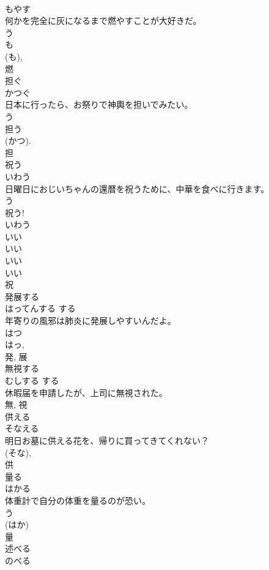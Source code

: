 \documentclass[8pt]{extreport}
\begin{document}
\begin{CJK}{UTF8}{min}
\\	もやす	
\\	何かを完全に灰になるまで燃やすことが大好きだ。	
\\	う 
\\	も 
\\	(も), 
\\	燃	
\\	担ぐ	
\\	かつぐ	
\\	日本に行ったら、お祭りで神輿を担いでみたい。	
\\	う 
\\	担う 
\\	(かつ). 
\\	担	
\\	祝う	
\\	いわう	
\\	日曜日におじいちゃんの還暦を祝うために、中華を食べに行きます。	
\\	う 
\\	祝う!	
\\	いわう 
\\	いい 
\\	いい
\\	いい
\\	いい 
\\	祝	
\\	発展する	
\\	はってんする	する 
\\	年寄りの風邪は肺炎に発展しやすいんだよ。	
\\	はつ 
\\	はっ, 
\\	発, 展	
\\	無視する	
\\	むしする	する 
\\	休暇届を申請したが、上司に無視された。	
\\	無, 視	
\\	供える	
\\	そなえる	
\\	明日お墓に供える花を、帰りに買ってきてくれない？	
\\	(そな), 
\\	供	
\\	量る	
\\	はかる	
\\	体重計で自分の体重を量るのが恐い。	
\\	う 
\\	(はか) 
\\	量	
\\	述べる	
\\	のべる	

\end{CJK}
\end{document}
